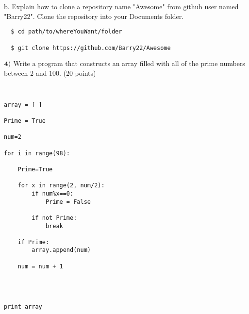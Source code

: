\documentclass{article}
\begin{document}
  b.  Explain how to clone a repository name "Awesome" from github user named "Barry22".  Clone the repository into your Documents folder.
  
  \begin{verbatim}
  $ cd path/to/whereYouWant/folder
  
  $ git clone https://github.com/Barry22/Awesome
  \end{verbatim}
    \vspace{4cm}
  
   
  \newpage
  
  $\bf{4)}$ Write a program that constructs an array filled with all of the prime numbers between 2 and 100. (20 points)
  
  \begin{verbatim}
  
  
array = [ ]

Prime = True

num=2

for i in range(98):

    Prime=True

    for x in range(2, num/2):
        if num%x==0:
            Prime = False

        if not Prime:
            break

    if Prime:
        array.append(num)

    num = num + 1

        


print array
  
  
  \end{verbatim}
  \vspace{0.5cm}
  
  
  
  

 
\end{document}

